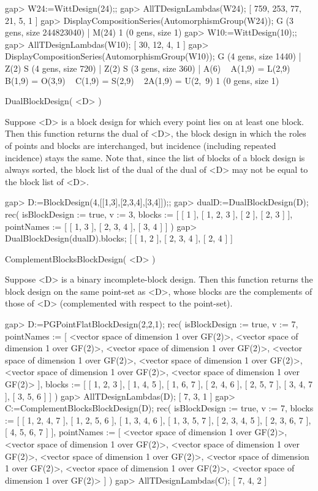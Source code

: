 \beginexample
gap> W24:=WittDesign(24);;
gap> AllTDesignLambdas(W24);
[ 759, 253, 77, 21, 5, 1 ]
gap> DisplayCompositionSeries(AutomorphismGroup(W24));
G (3 gens, size 244823040)
 | M(24)
1 (0 gens, size 1)
gap> W10:=WittDesign(10);;
gap> AllTDesignLambdas(W10);
[ 30, 12, 4, 1 ]
gap> DisplayCompositionSeries(AutomorphismGroup(W10));
G (4 gens, size 1440)
 | Z(2)
S (4 gens, size 720)
 | Z(2)
S (3 gens, size 360)
 | A(6) ~ A(1,9) = L(2,9) ~ B(1,9) = O(3,9) ~ C(1,9) = S(2,9) ~ 2A(1,9) = U(2,\
9)
1 (0 gens, size 1)
\endexample



\>DualBlockDesign( <D> )

Suppose <D> is a block design for which every point lies on at least
one block.  Then this function returns the dual of <D>, the block design
in which the roles of points and blocks are interchanged, but incidence
(including repeated incidence) stays the same.  Note that, since the
list of blocks of a block design is always sorted, the block list of
the dual of the dual of <D> may not be equal to the block list of <D>.

\beginexample
gap> D:=BlockDesign(4,[[1,3],[2,3,4],[3,4]]);;
gap> dualD:=DualBlockDesign(D);
rec( isBlockDesign := true, v := 3, 
  blocks := [ [ 1 ], [ 1, 2, 3 ], [ 2 ], [ 2, 3 ] ], 
  pointNames := [ [ 1, 3 ], [ 2, 3, 4 ], [ 3, 4 ] ] )
gap> DualBlockDesign(dualD).blocks;           
[ [ 1, 2 ], [ 2, 3, 4 ], [ 2, 4 ] ]
\endexample



\>ComplementBlocksBlockDesign( <D> )

Suppose <D> is a binary incomplete-block design.
Then this function returns the block design on the same
point-set as <D>, whose blocks are the complements of
those of <D> (complemented with respect to the point-set).

\beginexample
gap> D:=PGPointFlatBlockDesign(2,2,1);
rec( isBlockDesign := true, v := 7, 
  pointNames := [ <vector space of dimension 1 over GF(2)>, 
      <vector space of dimension 1 over GF(2)>, 
      <vector space of dimension 1 over GF(2)>, 
      <vector space of dimension 1 over GF(2)>, 
      <vector space of dimension 1 over GF(2)>, 
      <vector space of dimension 1 over GF(2)>, 
      <vector space of dimension 1 over GF(2)> ], 
  blocks := [ [ 1, 2, 3 ], [ 1, 4, 5 ], [ 1, 6, 7 ], [ 2, 4, 6 ], 
      [ 2, 5, 7 ], [ 3, 4, 7 ], [ 3, 5, 6 ] ] )
gap> AllTDesignLambdas(D);
[ 7, 3, 1 ]
gap> C:=ComplementBlocksBlockDesign(D);
rec( isBlockDesign := true, v := 7, 
  blocks := [ [ 1, 2, 4, 7 ], [ 1, 2, 5, 6 ], [ 1, 3, 4, 6 ], [ 1, 3, 5, 7 ], 
      [ 2, 3, 4, 5 ], [ 2, 3, 6, 7 ], [ 4, 5, 6, 7 ] ], 
  pointNames := [ <vector space of dimension 1 over GF(2)>, 
      <vector space of dimension 1 over GF(2)>, 
      <vector space of dimension 1 over GF(2)>, 
      <vector space of dimension 1 over GF(2)>, 
      <vector space of dimension 1 over GF(2)>, 
      <vector space of dimension 1 over GF(2)>, 
      <vector space of dimension 1 over GF(2)> ] )
gap> AllTDesignLambdas(C);
[ 7, 4, 2 ]
\endexample



